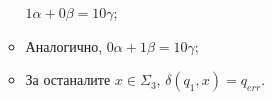 \begin{hint}
\begin{itemize}
\begin{itemize}
      $1\alpha + 0\beta = 10\gamma$;
    \item
      Аналогично, $0\alpha + 1\beta = 10\gamma$;
    \item
      За останалите $x \in \Sigma_3$, $\delta(q_{1},x) = q_{err}$.
    \end{itemize}    
  \end{itemize}
\end{hint}

